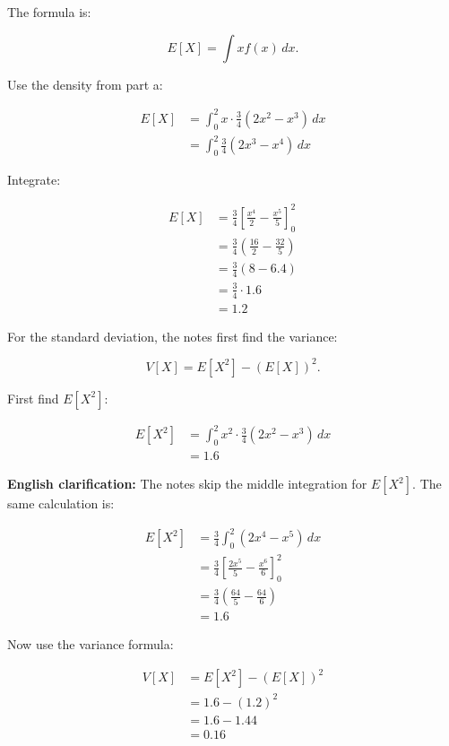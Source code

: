 \documentclass[10pt]{article}
\begin{document}
The formula is:

\[
E[X]=\int x f(x)\,dx.
\]

Use the density from part a:

\begin{align*}
E[X]
&=
\int_0^2
x\cdot \frac{3}{4}
\left(2x^2-x^3\right)\,dx \\[2mm]
&=
\int_0^2
\frac{3}{4}
\left(2x^3-x^4\right)\,dx
\end{align*}

Integrate:

\begin{align*}
E[X]
&=
\frac{3}{4}
\left[
\frac{x^4}{2}
-\frac{x^5}{5}
\right]_0^2 \\[2mm]
&=
\frac{3}{4}
\left(
\frac{16}{2}
-\frac{32}{5}
\right) \\[2mm]
&=
\frac{3}{4}(8-6.4) \\[2mm]
&=
\frac{3}{4}\cdot 1.6 \\[2mm]
&=1.2
\end{align*}

For the standard deviation, the notes first find
the variance:

\[
V[X]=E[X^2]-(E[X])^2.
\]

First find $E[X^2]$:

\begin{align*}
E[X^2]
&=
\int_0^2
x^2\cdot
\frac{3}{4}(2x^2-x^3)\,dx \\[2mm]
&=1.6
\end{align*}

\textbf{English clarification:}
The notes skip the middle integration for $E[X^2]$.
The same calculation is:

\begin{align*}
E[X^2]
&=
\frac{3}{4}
\int_0^2
(2x^4-x^5)\,dx \\[2mm]
&=
\frac{3}{4}
\left[
\frac{2x^5}{5}
-\frac{x^6}{6}
\right]_0^2 \\[2mm]
&=
\frac{3}{4}
\left(
\frac{64}{5}
-\frac{64}{6}
\right) \\[2mm]
&=1.6
\end{align*}

Now use the variance formula:

\begin{align*}
V[X]
&=
E[X^2]-(E[X])^2 \\[2mm]
&=
1.6-(1.2)^2 \\[2mm]
&=
1.6-1.44 \\[2mm]
&=0.16
\end{align*}
\end{document}
